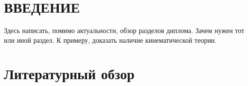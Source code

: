 \section*{ \centering ВВЕДЕНИЕ }
Здесь написать, помимо актуальности, обзор разделов диплома. Зачем нужен тот или иной раздел.
К примеру, доказать наличие кинематической теории.
\newpage
\section{Литературный обзор}







